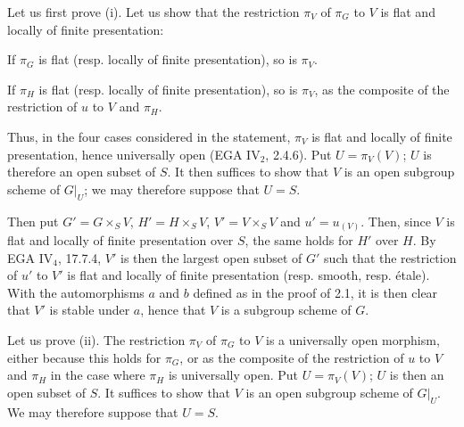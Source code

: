 Let us first prove (i). Let us show that the restriction $\pi_V$ of $\pi_G$ to $V$ is flat and locally of finite presentation:
\begin{enumeratea}
\item If $\pi_G$ is flat (resp. locally of finite presentation), so is $\pi_V$.
\item If $\pi_H$ is flat (resp. locally of finite presentation), so is $\pi_V$, as the composite of the restriction of $u$ to $V$ and $\pi_H$.
\end{enumeratea}
Thus, in the four cases considered in the statement, $\pi_V$ is flat and locally of finite presentation, hence universally open (EGA IV$_2$, 2.4.6). Put $U=\pi_V(V)$; $U$ is therefore an open subset of $S$. It then suffices to show that $V$ is an open subgroup scheme of $G|_U$; we may therefore suppose that $U=S$.

Then put $G'=G\times_SV$, $H'=H\times_SV$, $V'=V\times_SV$ and $u'=u_{(V)}$. Then, since $V$ is flat and locally of finite presentation over $S$, the same holds for $H'$ over $H$. By EGA IV$_4$, 17.7.4, $V'$ is then the largest open subset of $G'$ such that the restriction of $u'$ to $V'$ is flat and locally of finite presentation (resp. smooth, resp. étale). With the automorphisms $a$ and $b$ defined as in the proof of 2.1, it is then clear that $V'$ is stable under $a$, hence that $V$ is a subgroup scheme of $G$.

Let us prove (ii). The restriction $\pi_V$ of $\pi_G$ to $V$ is a universally open morphism, either because this holds for $\pi_G$, or as the composite of the restriction of $u$ to $V$ and $\pi_H$ in the case where $\pi_H$ is universally open. Put $U=\pi_V(V)$; $U$ is then an open subset of $S$. It suffices to show that $V$ is an open subgroup scheme of $G|_U$. We may therefore suppose that $U=S$.

